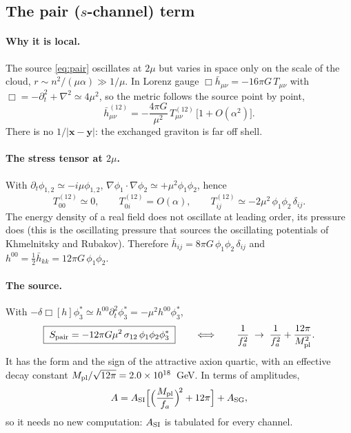 \documentclass[11pt]{article}
\newcommand{\bx}{\mathbf{x}}\newcommand{\by}{\mathbf{y}}
\newcommand{\Mpl}{M_{\rm pl}}
\begin{document}
\subsection{The pair ($s$-channel) term}\label{sec:pair}
\paragraph{Why it is local.} The source \eqref{eq:pair} oscillates at $2\mu$ but varies in space only on the scale of the cloud,
$r\sim n^2/(\mu\alpha)\gg1/\mu$. In Lorenz gauge $\Box\bar h_{\mu\nu}=-16\pi G\,T_{\mu\nu}$ with
$\Box=-\partial_t^2+\nabla^2\simeq4\mu^2$, so the metric follows the source point by point,
\begin{equation}
\bar h^{(12)}_{\mu\nu}=-\frac{4\pi G}{\mu^2}\,T^{(12)}_{\mu\nu}\,\big[1+O(\alpha^2)\big].
\end{equation}
There is no $1/|\bx-\by|$: the exchanged graviton is far off shell.
\paragraph{The stress tensor at $2\mu$.} With $\partial_t\phi_{1,2}\simeq-i\mu\phi_{1,2}$, $\nabla\phi_1\!\cdot\!\nabla\phi_2\simeq+\mu^2\phi_1\phi_2$, hence
\begin{equation}
T^{(12)}_{00}\simeq0,\qquad T^{(12)}_{0i}=O(\alpha),\qquad T^{(12)}_{ij}\simeq-2\mu^2\,\phi_1\phi_2\,\delta_{ij}.
\end{equation}
The energy density of a real field does not oscillate at leading order, its pressure does (this is the oscillating pressure that
sources the oscillating potentials of Khmelnitsky and Rubakov). Therefore $\bar h_{ij}=8\pi G\,\phi_1\phi_2\,\delta_{ij}$ and
$h^{00}=\tfrac12\bar h_{kk}=12\pi G\,\phi_1\phi_2$.
\paragraph{The source.} With $-\delta\Box[h]\phi_3^*\simeq h^{00}\partial_t^2\phi_3^*=-\mu^2h^{00}\phi_3^*$,
\begin{equation}
\boxed{\;S_{\rm pair}=-12\pi G\mu^2\,\sigma_{12}\,\phi_1\phi_2\phi_3^*\;}
\qquad\Longleftrightarrow\qquad \frac{1}{f_a^2}\;\to\;\frac{1}{f_a^2}+\frac{12\pi}{\Mpl^2}. \label{eq:Spair}
\end{equation}
It has the form and the sign of the attractive axion quartic, with an effective decay constant
$\Mpl/\sqrt{12\pi}=2.0\times10^{18}$~GeV. In terms of amplitudes,
\begin{equation}
A=A_{\rm SI}\Big[\Big(\frac{\Mpl}{f_a}\Big)^{\!2}+12\pi\Big]+A_{\rm SG},
\end{equation}
so it needs no new computation: $A_{\rm SI}$ is tabulated for every channel.
\end{document}
